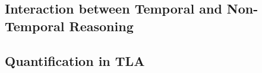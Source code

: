 \subsection{Interaction between Temporal and Non-Temporal Reasoning}

{}

{}



\subsection{Quantification in TLA}
\myframe{}{}










